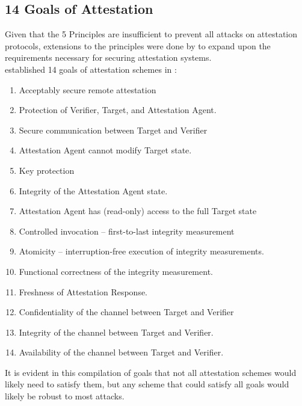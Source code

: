 \documentclass[acmsmall]{acmart}
\theoremstyle{definition}
\begin{document}
\subsection{14 Goals of Attestation}
Given that the 5 Principles are insufficient to prevent
all attacks on attestation protocols, extensions to the principles
were done by \citet{Usman:2023:Attestation-Assurance-Arguments,Banks:2021:Remote-Attestation-Literature-Review} to expand
upon the requirements necessary for securing attestation systems. \\
\citeauthor{Usman:2023:Attestation-Assurance-Arguments} established
14 goals of attestation schemes in \cite{Usman:2023:Attestation-Assurance-Arguments}:
\begin{enumerate}
  \item Acceptably secure remote attestation
  \item Protection of Verifier, Target, and Attestation Agent.
  \item Secure communication between Target and Verifier
  \item Attestation Agent cannot modify Target state.
  \item Key protection
  \item Integrity of the Attestation Agent state.
  \item Attestation Agent has (read-only) access to the full Target state
  \item Controlled invocation -- first-to-last integrity measurement
  \item Atomicity -- interruption-free execution of integrity measurements.
  \item Functional correctness of the integrity measurement.
  \item Freshness of Attestation Response.
  \item Confidentiality of the channel between Target and Verifier
  \item Integrity of the channel between Target and Verifier.
  \item Availability of the channel between Target and Verifier.
\end{enumerate}
It is evident in this compilation of goals that not all attestation
schemes would likely need to satisfy them, but any scheme that could
satisfy all goals would likely be robust to most attacks.
\end{document}
